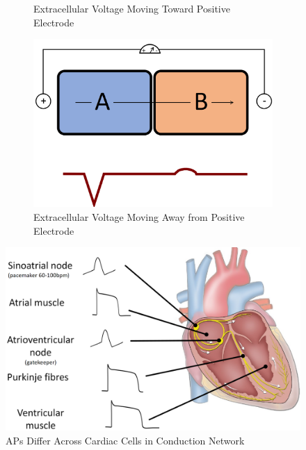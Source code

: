 \documentclass[11pt,fleqn]{book} %
\begin{document}
\begin{figure}[h!]
\begin{subfigure}{0.45\textwidth}
        \caption{Extracellular Voltage Moving
Toward Positive Electrode}
    \end{subfigure}
    \begin{subfigure}{0.45\textwidth}
        \includegraphics[width=\textwidth]{Pictures/Screenshot 2024-04-03 234154.png}
        \caption{Extracellular Voltage Moving
Away from Positive Electrode}
    \end{subfigure}
    \caption{}
\end{figure}

\begin{figure}[h!]
\begin{center}
    \includegraphics[width=0.5\linewidth]{Pictures/Screenshot 2024-04-03 234821.png}
    \caption{APs Differ Across Cardiac Cells in
Conduction Network}
\end{center}
\end{figure}
\end{document}
